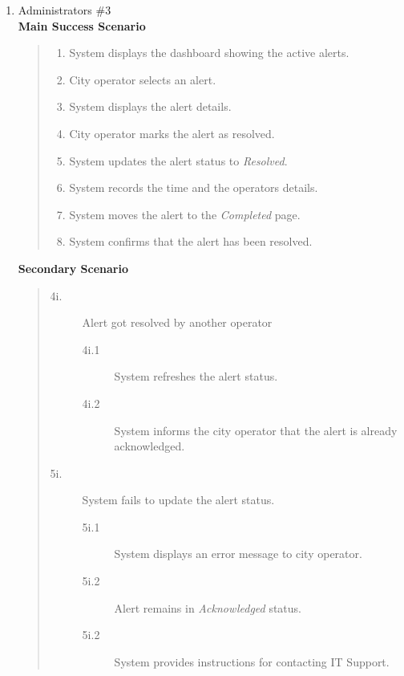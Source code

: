 \documentclass[]{article}
\begin{document}
\begin{enumerate}[{\bf BE6.}]
\begin{enumerate}[{\bf VP1.}]
			\item Administrators \#3 \\
				\textbf{Main Success Scenario} 
                    \begin{quote}
                    \begin{enumerate}[1.]
                        \item System displays the dashboard showing the active alerts.
                        \item City operator selects an alert.
                        \item System displays the alert details.
                        \item City operator marks the alert as resolved.
                        \item System updates the alert status to \textit{Resolved}.
                        \item System records the time and the operators details.
                        \item System moves the alert to the \textit{Completed} page.
                        \item System confirms that the alert has been resolved.
                    \end{enumerate}
                    \end{quote}
                \textbf{Secondary Scenario} 
                \begin{quote}
                    \begin{description}
                        \item[\textmd{4i.}] Alert got resolved by another operator
                        \begin{description}
                            \item[\textmd{4i.1}] System refreshes the alert status.
                            \item[\textmd{4i.2}] System informs the city operator that the alert is already acknowledged.
                        \end{description}
                        \item[\textmd{5i.}] System fails to update the alert status.
                        \begin{description}
                            \item[\textmd{5i.1}] System displays an error message to city operator.
                            \item[\textmd{5i.2}] Alert remains in \textit{Acknowledged} status.
                            \item[\textmd{5i.2}] System provides instructions for contacting IT Support.
                        \end{description}
                    \end{description}
                \end{quote}
                

\end{enumerate}
\end{enumerate}
\end{document}
